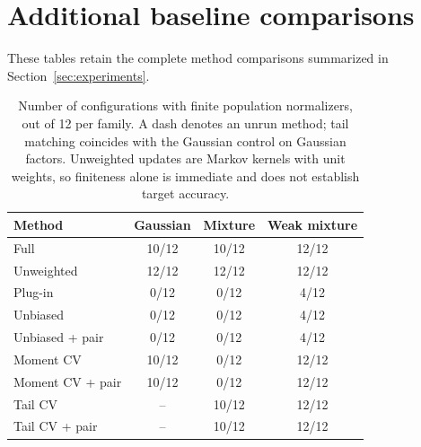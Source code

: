 \section{Additional baseline comparisons}\label{app:baseline-tables}
These tables retain the complete method comparisons summarized in Section~\ref{sec:experiments}.

\begin{table}[ht]
 \centering
 \caption{Number of configurations with finite population normalizers, out of 12 per family. A dash denotes an unrun method; tail matching coincides with the Gaussian control on Gaussian factors. Unweighted updates are Markov kernels with unit weights, so finiteness alone is immediate and does not establish target accuracy.}
 \label{tab:certificates}
 \begin{tabular}{lccc}
 \toprule
 Method & Gaussian & Mixture & Weak mixture\\
 \midrule
 Full & 10/12 & 10/12 & 12/12\\
 Unweighted & 12/12 & 12/12 & 12/12\\
 Plug-in & 0/12 & 0/12 & 4/12\\
 Unbiased & 0/12 & 0/12 & 4/12\\
 Unbiased + pair & 0/12 & 0/12 & 4/12\\
 Moment CV & 10/12 & 0/12 & 12/12\\
 Moment CV + pair & 10/12 & 0/12 & 12/12\\
 Tail CV & -- & 10/12 & 12/12\\
 Tail CV + pair & -- & 10/12 & 12/12\\
 \bottomrule
 \end{tabular}
\end{table}

